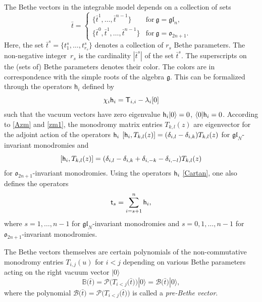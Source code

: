 \documentclass[pdftex]{sigma}
\newcommand{\bt}{{\bar t}}
\theoremstyle{definition}
\def\BB{{\mathbb{B}}}
\def\r#1{\eqref{#1}}
\def\sT{{\sf T}}
\def\rvec{|0\rangle}
\def\lvec{\langle0|}
\def\hc{{\sf h}}
\def\vk{\chi}
\begin{document}
The Bethe vectors
 in the integrable model
depends on a collection of sets
\[%
\bt=\begin{cases}
\bigl\{\bt^1,\dots,\bt^{n-1}\bigr\}&\text{for}\  \mathfrak{g}=\mathfrak{gl}_n,\\
\bigl\{\bt^0,\bt^1,\dots,\bt^{n-1}\bigr\}&\text{for}\  \mathfrak{g}=\mathfrak{o}_{2n+1}.
\end{cases}
\]
Here, the set $\bt^s=\{t^s_1,\dots,t^s_{r_s}\}$ denotes a collection of $r_s$
Bethe parameters. The non-negative integer~$r_s$ is the cardinality $|\bt^s|$ of the set
$\bt^s$.
The superscripts on the (sets of) Bethe parameters denotes their color.
 The colors are in correspondence with the simple roots of the algebra
 $\mathfrak{g}$.
This can be formalized through the operators $\mathsf{h}_i$ defined by
\begin{equation}\label{Cartan}
\vk_i \hc_i=\sT_{i,i}-\lambda_i[0]
\end{equation}
such that the vacuum vectors have zero eigenvalue
$
\hc_i \rvec =0$, $ \lvec \hc_i=0 $.
According to \r{Azm} and \r{zm1}, the monodromy matrix entries
$T_{k,l}(z)$ are eigenvector for the adjoint action of the operators
$\hc_i$
$
[\hc_i,T_{k,l}(z)]= (\delta_{i,l}-\delta_{i,k}) T_{k,l}(z)
$
for $\mathfrak{gl}_N$-invariant monodromies
and
\[%
[\hc_i,T_{k,l}(z)]=(\delta_{i,l}-\delta_{i,k}+\delta_{i,-k}-\delta_{i,-l}) T_{k,l}(z)
\]
for $\mathfrak{o}_{2n+1}$-invariant monodromies. Using the operators $\hc_i$ \r{Cartan}, one also defines the operators
\begin{equation}\label{col-op}
\mathsf{t}_s=\sum_{i=s+1}^n \hc_i ,
\end{equation}
where $s=1,\dots,n-1$ for $\mathfrak{gl}_N$-invariant monodromies
and $s=0,1,\dots,n-1$ for $\mathfrak{o}_{2n+1}$-invariant monodromies.

 The Bethe vectors themselves are certain
 polynomials of the non-commutative monodromy entries $T_{i,j}(u)$ for $i <j$ depending on various Bethe parameters acting on the right vacuum vector $\rvec$
\begin{equation}\label{bvgr}
\BB\bigl(\bar t\bigr)=\mathcal{P}\bigl(T_{i< j}
\bigl(\bar t\bigr)\bigr)
 \rvec=\mathcal{B}\bigl(\bar t\bigr) \rvec,
\end{equation}
where the polynomial $\mathcal{B}\bigl(\bar t\bigr)=\mathcal{P}\bigl(T_{i< j}\bigl(\bar t\bigr)\bigr)$ is called a \textit{pre-Bethe vector}.
\end{document}
